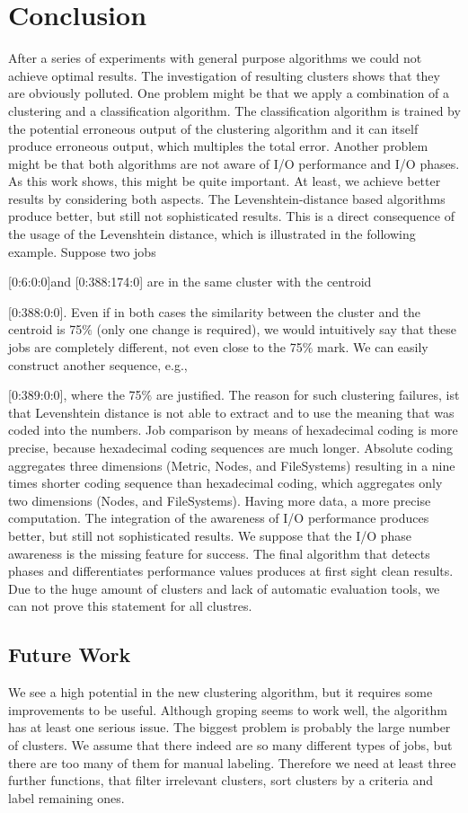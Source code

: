 \documentclass{jhps}
\begin{document}
{{{{\section{Conclusion}
After a series of experiments with general purpose algorithms we could not achieve optimal results.
The investigation of resulting clusters shows that they are obviously polluted.
One problem might be that we apply a combination of a clustering and a classification algorithm.
The classification algorithm is trained by the potential erroneous output of the clustering algorithm and it can itself produce erroneous output, which multiples the total error.
Another problem might be that both algorithms are not aware of I/O performance and I/O phases.
As this work shows, this might be quite important.
At least, we achieve better results by considering both aspects.
The Levenshtein-distance based algorithms produce better, but still not sophisticated results.
This is a direct consequence of the usage of the Levenshtein distance, which is illustrated in the following example.
Suppose two jobs {[0:6:0:0]and [0:388:174:0] are in the same cluster with the centroid {[0:388:0:0].
Even if in both cases the similarity between the cluster and the centroid is 75$\%$  (only one change is required), we would intuitively say that these jobs are completely different, not even close to the 75$\%$  mark.
We can easily construct another sequence, e.g., {[0:389:0:0], where the 75$\%$  are justified.
The reason for such clustering failures, ist that Levenshtein distance is not able to extract and to use the meaning that was coded into the numbers.
Job comparison by means of hexadecimal coding is more precise, because hexadecimal coding sequences are much longer.
Absolute coding aggregates three dimensions (Metric, Nodes, and FileSystems) resulting in a nine times shorter coding sequence than hexadecimal coding, which aggregates only two dimensions (Nodes, and FileSystems).
Having more data, a more precise computation.
The integration of the awareness of I/O performance produces better, but still not sophisticated results.
We suppose that the I/O phase awareness is the missing feature for success.
The final algorithm that detects phases and differentiates performance values produces at first sight clean results.
Due to the huge amount of clusters and lack of automatic evaluation tools, we can not prove this statement for all clustres.

\subsection{Future Work}
We see a high potential in the new clustering algorithm, but it requires some improvements to be useful.
Although groping seems to work well, the algorithm has at least one serious issue.
The biggest problem is probably the large number of clusters.
We assume that there indeed are so many different types of jobs, but there are too many of them for manual labeling.
Therefore we need at least three further functions, that filter irrelevant clusters, sort clusters by a criteria and label remaining ones.


}}}}}}}
\end{document}
